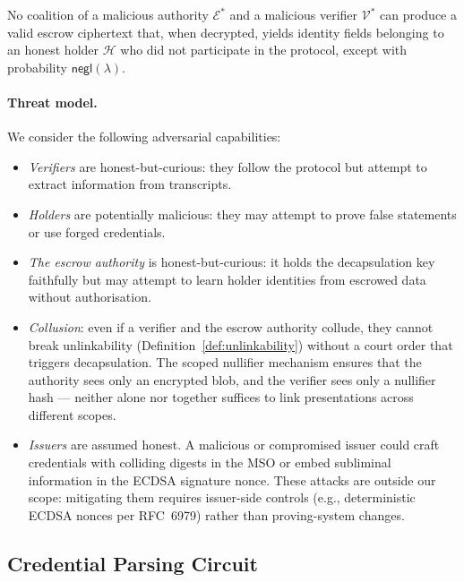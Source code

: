 \begin{definition}\label{def:non-frame}
  No coalition of a malicious authority $\mathcal{E}^*$ and a malicious verifier $\mathcal{V}^*$ can produce a valid escrow ciphertext that, when decrypted, yields identity fields belonging to an honest holder $\mathcal{H}$ who did not participate in the protocol, except with probability $\mathsf{negl}(\lambda)$.
\end{definition}

\paragraph{Threat model.}
We consider the following adversarial capabilities:
\begin{itemize}
  \item \emph{Verifiers} are honest-but-curious: they follow the protocol but attempt to extract information from transcripts.
  \item \emph{Holders} are potentially malicious: they may attempt to prove false statements or use forged credentials.
  \item \emph{The escrow authority} is honest-but-curious: it holds the decapsulation key faithfully but may attempt to learn holder identities from escrowed data without authorisation.
  \item \emph{Collusion}: even if a verifier and the escrow authority collude, they cannot break unlinkability (Definition~\ref{def:unlinkability}) without a court order that triggers decapsulation. The scoped nullifier mechanism ensures that the authority sees only an encrypted blob, and the verifier sees only a nullifier hash --- neither alone nor together suffices to link presentations across different scopes.
  \item \emph{Issuers} are assumed honest. A malicious or compromised issuer could craft credentials with colliding digests in the MSO or embed subliminal information in the ECDSA signature nonce. These attacks are outside our scope: mitigating them requires issuer-side controls (e.g., deterministic ECDSA nonces per RFC~6979) rather than proving-system changes.
\end{itemize}

\subsection{Credential Parsing Circuit}\label{sec:parsing}

